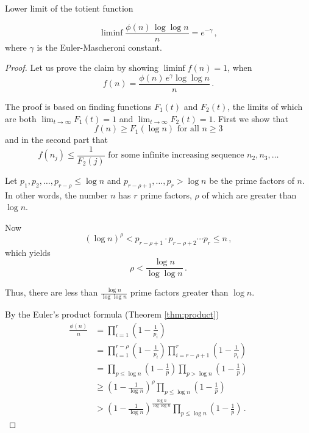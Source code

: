 \documentclass{article}
\begin{document}
\begin{theorem}
Lower limit of the totient function \emph{\cite{HardyWright}}

\begin{equation*}
    \liminf{\frac{\phi(n)\,\log\log n}{n}}=e^{-\gamma}\,,
\end{equation*}
where $\gamma$ is the Euler-Mascheroni constant.

\begin{proof}

Let us prove the claim by showing $\liminf{f(n)} = 1$, when
\begin{equation*}
    f(n)= \frac{\phi(n)\,e^\gamma \log\log n}{n}\,.
\end{equation*}

The proof is based on finding functions $F_1(t)$ and $F_2(t)$, the limits of which are both $\lim_{t\rightarrow \infty} F_1(t) = 1$ and $\lim_{t\rightarrow \infty} F_2(t) = 1$. First we show that 
\begin{equation}
\label{eq:first}
    f(n) \geq F_1(\log n)\text{ for all }n\geq 3
\end{equation}
and in the second part that
\begin{equation}
\label{eq:second}
    f(n_j) \leq \frac{1}{F_2(j)}\text{ for some infinite increasing sequence }n_2, n_3,\dots
\end{equation}

Let $p_1,p_2,\dots,p_{r-\rho} \leq \log n$ and $p_{r-\rho+1},\dots,p_r > \log n$ be the prime factors of $n$. In other words, the number $n$ has $r$ prime factors, $\rho$ of which are greater than $\log n$.

Now
\begin{equation*}
    (\log n)^\rho < p_{r-\rho+1} \cdot p_{r-\rho+2} \cdots p_r \leq n\,,
\end{equation*}
which yields
\begin{equation*}
    \rho < \frac{\log n}{\log\log n}\,.
\end{equation*}

Thus, there are less than $\frac{\log n}{\log\log n}$ prime factors greater than $\log n$.

By the Euler's product formula (Theorem \ref{thm:product})
\begin{align*}
    \frac{\phi(n)}{n} & = \prod_{i=1}^r\left(1-\frac{1}{p_i}\right)\\
    & = \prod_{i=1}^{r-\rho}\left(1-\frac{1}{p_i}\right) \prod_{i=r-\rho+1}^r\left(1-\frac{1}{p_i}\right)\\
    & = \prod_{p\leq\log n}\left(1-\frac{1}{p}\right) \prod_{p>\log n}\left(1-\frac{1}{p}\right)\\
    & \geq \left(1-\frac{1}{\log n}\right)^\rho \prod_{p\leq\log n}\left(1-\frac{1}{p}\right) \\
    & > \left(1-\frac{1}{\log n}\right)^\frac{\log n}{\log \log n} \prod_{p\leq\log n}\left(1-\frac{1}{p}\right)\,.
\end{align*}


\end{proof}
\end{theorem}
\end{document}

